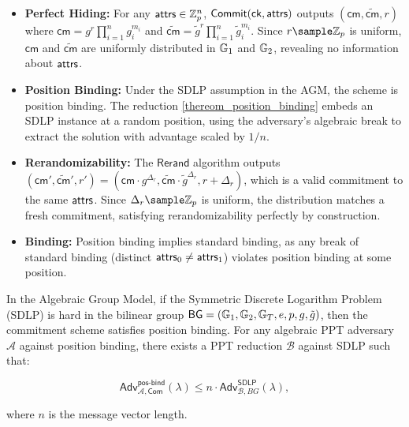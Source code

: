 \begin{itemize}
    \item \textbf{Perfect Hiding:} For any $\mathsf{attrs} \in \mathbb{Z}_p^n$, $\mathsf{Commit}(\mathsf{ck}, \mathsf{attrs})$ outputs $(\mathsf{cm}, \widetilde{\mathsf{cm}}, r)$ where $\mathsf{cm} = g^r \prod_{i=1}^n g_i^{m_i}$ and $\widetilde{\mathsf{cm}} = \tilde{g}^r \prod_{i=1}^n \tilde{g}_i^{m_i}$. Since $r \sample \Z_p$ is uniform, $\mathsf{cm}$ and $\widetilde{\mathsf{cm}}$ are uniformly distributed in $\mathbb{G}_1$ and $\mathbb{G}_2$, revealing no information about $\mathsf{attrs}$.

    \item \textbf{Position Binding:} Under the SDLP assumption in the AGM, the scheme is position binding. The reduction \ref{thereom_position_binding} embeds an SDLP instance at a random position, using the adversary’s algebraic break to extract the solution with advantage scaled by $1/n$.

    \item \textbf{Rerandomizability:} The $\mathsf{Rerand}$ algorithm outputs $(\mathsf{cm}', \widetilde{\mathsf{cm}}', r') = (\mathsf{cm} \cdot g^{\Delta_r}, \widetilde{\mathsf{cm}} \cdot \tilde{g}^{\Delta_r}, r + \Delta_r)$, which is a valid commitment to the same $\mathsf{attrs}$. Since $\Delta_r \sample \Z_p$ is uniform, the distribution matches a fresh commitment, satisfying rerandomizability perfectly by construction.

    \item \textbf{Binding:} Position binding implies standard binding, as any break of standard binding (distinct $\mathsf{attrs}_0 \neq \mathsf{attrs}_1$) violates position binding at some position.
\end{itemize}

\begin{theorem}\label{thereom_position_binding}
In the Algebraic Group Model, if the Symmetric Discrete Logarithm Problem (SDLP) is hard in the bilinear group $\mathsf{BG} = (\mathbb{G}_1, \mathbb{G}_2, \mathbb{G}_T, e, p, g, \tilde{g})$, then the commitment scheme satisfies position binding. For any algebraic PPT adversary $\mathcal{A}$ against position binding, there exists a PPT reduction $\mathcal{B}$ against SDLP such that:

$$\mathsf{Adv}^{\mathsf{pos\text{-}bind}}_{\mathcal{A}, \mathsf{Com}}(\lambda) \leq n \cdot \mathsf{Adv}^{\mathsf{SDLP}}_{\mathcal{B}, BG}(\lambda),$$

where $n$ is the message vector length.
\end{theorem}


